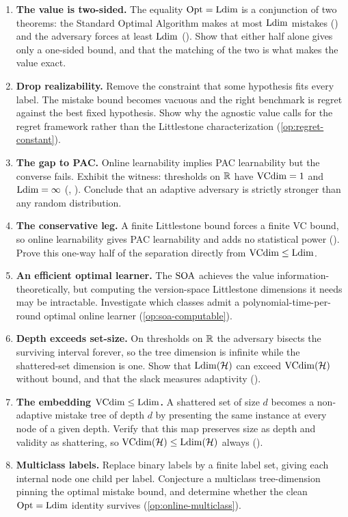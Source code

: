 \begin{enumerate}[leftmargin=*,itemsep=3pt]
\item \textbf{The value is two-sided.} The equality $\mathrm{Opt}=\mathrm{Ldim}$ is a conjunction of two theorems: the Standard Optimal Algorithm makes at most $\mathrm{Ldim}$ mistakes () and the adversary forces at least $\mathrm{Ldim}$ (). Show that either half alone gives only a one-sided bound, and that the matching of the two is what makes the value exact.

\item \textbf{Drop realizability.} Remove the constraint that some hypothesis fits every label. The mistake bound becomes vacuous and the right benchmark is regret against the best fixed hypothesis. Show why the agnostic value calls for the regret framework rather than the Littlestone characterization (\cref{op:regret-constant}).

\item \textbf{The gap to PAC.} Online learnability implies PAC learnability but the converse fails. Exhibit the witness: thresholds on $\mathbb{R}$ have $\mathrm{VCdim}=1$ and $\mathrm{Ldim}=\infty$ (, ). Conclude that an adaptive adversary is strictly stronger than any random distribution.

\item \textbf{The conservative leg.} A finite Littlestone bound forces a finite VC bound, so online learnability gives PAC learnability and adds no statistical power (). Prove this one-way half of the separation directly from $\mathrm{VCdim}\le\mathrm{Ldim}$.

\item \textbf{An efficient optimal learner.} The $\mathrm{SOA}$ achieves the value information-theoretically, but computing the version-space Littlestone dimensions it needs may be intractable. Investigate which classes admit a polynomial-time-per-round optimal online learner (\cref{op:soa-computable}).

\item \textbf{Depth exceeds set-size.} On thresholds on $\mathbb{R}$ the adversary bisects the surviving interval forever, so the tree dimension is infinite while the shattered-set dimension is one. Show that $\mathrm{Ldim}(\mathcal{H})$ can exceed $\mathrm{VCdim}(\mathcal{H})$ without bound, and that the slack measures adaptivity ().

\item \textbf{The embedding $\mathrm{VCdim}\le\mathrm{Ldim}$.} A shattered set of size $d$ becomes a non-adaptive mistake tree of depth $d$ by presenting the same instance at every node of a given depth. Verify that this map preserves size as depth and validity as shattering, so $\mathrm{VCdim}(\mathcal{H})\le\mathrm{Ldim}(\mathcal{H})$ always ().

\item \textbf{Multiclass labels.} Replace binary labels by a finite label set, giving each internal node one child per label. Conjecture a multiclass tree-dimension pinning the optimal mistake bound, and determine whether the clean $\mathrm{Opt}=\mathrm{Ldim}$ identity survives (\cref{op:online-multiclass}).
\end{enumerate}

